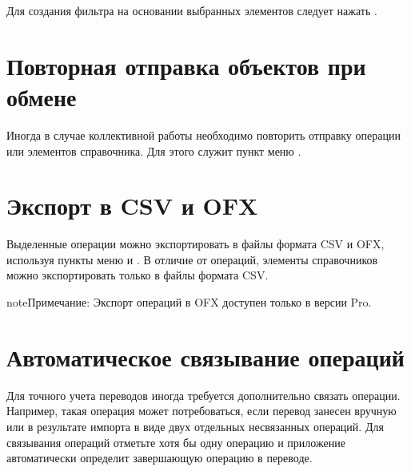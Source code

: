 \documentclass[a4paper,10pt,russian]{sphinxmanual}
\begin{document}
Для создания фильтра на основании выбранных элементов следует нажать .

\noindent{}

\noindent{}


\section{Повторная отправка объектов при обмене}
\label{\detokenize{bulk-actions:id6}}
Иногда в случае коллективной работы необходимо повторить отправку операции или элементов справочника. Для этого служит
пункт меню .

\noindent{}

\noindent{}

\noindent{}


\section{Экспорт в CSV и OFX}
\label{\detokenize{bulk-actions:csv-ofx}}
Выделенные операции можно экспортировать в файлы формата CSV и OFX, используя пункты меню 
и . В отличие от операций, элементы справочников можно экспортировать только в файлы формата
CSV.

\begin{sphinxadmonition}{note}{Примечание:}
Экспорт операций в OFX доступен только в версии Pro.
\end{sphinxadmonition}

\noindent{}

\noindent{}

\noindent{}


\section{Автоматическое связывание операций}
\label{\detokenize{bulk-actions:id7}}
Для точного учета переводов иногда требуется дополнительно связать операции. Например,
такая операция может потребоваться, если перевод занесен вручную или в результате импорта
в виде двух отдельных несвязанных операций. Для связывания операций отметьте хотя бы
одну операцию и приложение автоматически определит завершающую операцию в переводе.
\end{document}

